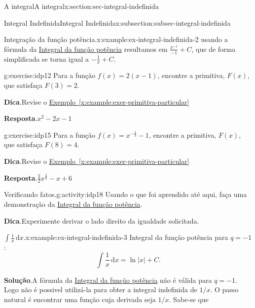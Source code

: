 \documentclass[oneside,10pt,]{article}
\newcommand{\blocktitlefont}{\relax}
\newcommand{\xreffont}{\relax}
\numberwithin{equation}{section}
\newcommand{\dd}{\mathrm{d}}
\newcommand{\integral}[2]{\displaystyle\int {#1}\,\dd {#2}}
\begin{document}
\begin{sectionptx}{A integral}{}{A integral}{}{}{x:section:sec-integral-indefinida}
\begin{subsectionptx}{Integral Indefinida}{}{Integral Indefinida}{}{}{x:subsection:subsec-integral-indefinida}
\begin{example}{Integração da função potência.}{x:example:ex-integral-indefinida-2}
\noindentNovamente usando a fórmula da \hyperref[x:assemblage:prob-integral-funcao-potencia]{Integral da função potência}  resultamos em \(\frac{x^{-1}}{-1} + C\), que de forma simplificada se torna igual a \(-\frac{1}{x} + C\).%
%
\end{example}
\begin{inlineexercise}{}{g:exercise:idp12}%
Para a função \(f(x)=2(x-1)\), encontre a primitiva, \(F(x)\), que satisfaça \(F(3)=2\).%
\par\smallskip%
\noindent\textbf{\blocktitlefont Dica}.\hypertarget{g:hint:idp13}{}\quad{}Revise o \hyperref[x:example:exer-primitiva-particular]{Exemplo~{\xreffont\ref{x:example:exer-primitiva-particular}}}%
\par\smallskip%
\noindent\textbf{\blocktitlefont Resposta}.\hypertarget{g:answer:idp14}{}\quad{}\(x^2-2x-1\)%
\end{inlineexercise}%
\begin{inlineexercise}{}{g:exercise:idp15}%
Para a função \(f(x)=x^{-\frac{1}{3}}-1\), encontre a primitiva, \(F(x)\), que satisfaça \(F(8)=4\).%
\par\smallskip%
\noindent\textbf{\blocktitlefont Dica}.\hypertarget{g:hint:idp16}{}\quad{}Revise o \hyperref[x:example:exer-primitiva-particular]{Exemplo~{\xreffont\ref{x:example:exer-primitiva-particular}}}%
\par\smallskip%
\noindent\textbf{\blocktitlefont Resposta}.\hypertarget{g:answer:idp17}{}\quad{}\(\frac{3}{2}  x^{\frac{2}{3}} - x + 6\)%
\end{inlineexercise}%
\begin{activity}{Verificando fatos.}{g:activity:idp18}%
Usando o que foi aprendido até aqui, faça uma demonstração da \hyperref[x:assemblage:prob-integral-funcao-potencia]{Integral da função potência}.%
\par\smallskip%
\noindent\textbf{\blocktitlefont Dica}.\hypertarget{g:hint:idp19}{}\quad{}Experimente derivar o lado direito da igualdade solicitada.%
\end{activity}%
\begin{example}{\(\integral{\frac{1}{x}}{x}\).}{x:example:ex-integral-indefinida-3}%
Integral da função potência para \(q=-1\):%
\begin{equation*}
\integral{\frac{1}{x}}{x} = \ln{|x|} + C\text{.}
\end{equation*}
%
\par\smallskip%
\noindent\textbf{\blocktitlefont Solução}.\hypertarget{g:solution:idp20}{}\quad{}A fórmula da \hyperref[x:assemblage:prob-integral-funcao-potencia]{Integral da função potência} não é válida para \(q=-1\). Logo não é possivel utilizá-la para obter a integral indefinida de \(1/x\). O passo natural é encontrar uma função cuja derivada seja \(1/x\). Sabe-se que%

\end{example}
\end{subsectionptx}
\end{sectionptx}
\end{document}

